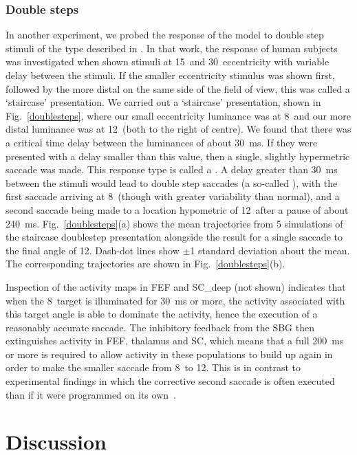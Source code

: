 \subsubsection{Double steps}

In another experiment, we probed the response of the model to double step
stimuli of the type described in \cite{becker_analysis_1979}. In that
work, the response of human subjects was investigated when shown stimuli
at 15\dg~and 30\dg~eccentricity with variable delay between
the stimuli. If the smaller eccentricity stimulus was shown first, followed
by the more distal on the same side of the field of view, this was called
a `staircase' presentation.
We carried
out a `staircase' presentation, shown in Fig.~\ref{doublesteps},
where our small eccentricity luminance was at 8\dg~and our more
distal luminance was at 12\dg~(both to the right of centre). We
found that there was a critical time delay between the luminances
of about 30~ms. If they were presented with a delay smaller than this
value, then a single, slightly hypermetric saccade was made. This
response type is called a . A delay greater
than 30~ms between the stimuli would lead to double step saccades
(a so-called ),
with the first saccade arriving at 8\dg~(though with greater
variability than normal), and a second saccade being made
to a location hypometric of 12\dg~after a pause of about 240~ms.
Fig.~\ref{doublesteps}(a) shows the mean trajectories from 5 simulations
of the staircase doublestep presentation alongside the result for a
single saccade to the final angle of 12\dg. Dash-dot lines show
$\pm$1 standard deviation about the mean. The corresponding trajectories
are shown in Fig.~\ref{doublesteps}(b).

Inspection of the activity maps in FEF and SC\_deep (not shown) indicates
that when
the 8\dg~target is illuminated for 30~ms or more, the activity
associated with this target angle is able to dominate the activity,
hence the execution of a reasonably accurate saccade. The inhibitory
feedback from the SBG then extinguishes activity in FEF, thalamus and
SC, which means that a full 200~ms or more is required to allow
activity in these populations to build up again in order to make the
smaller saccade from 8\dg~to 12\dg. This is in contrast
to experimental findings in which the corrective second saccade is
often executed  than if it were programmed on its
own~\citep{becker_analysis_1979}.


\section{Discussion}

